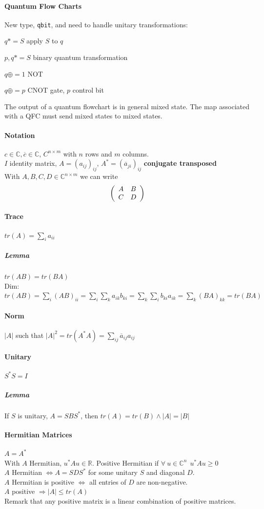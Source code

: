 \documentclass[10pt]{report}
\begin{document}
\paragraph{Quantum Flow Charts} New type, \texttt{qbit}, and need to handle unitary transformations:
\begin{list}{}{}
	\item $q*=S$ apply $S$ to $q$
	\item $p,q*=S$ binary quantum transformation
	\item $q\oplus =1$ NOT
	\item $q\oplus =p$ CNOT gate, $p$ control bit
\end{list}
The output of a quantum flowchart is in general mixed state. The map associated with a QFC must send mixed states to mixed states.
\paragraph{Notation} $c\in \mathbb{C}, \overline{c} \in \mathbb{C}$, $C^{n\times m}$ with $n$ rows and $m$ columns.\\
$I$ identity matrix, $A= (a_{ij})_{ij}$, $A^* = (\overline{a}_{ji})_{ij}$ \textbf{conjugate transposed}\\
With $A,B,C,D\in \mathbb{C}^{n\times m}$ we can write
$$\left(\begin{array}{c c}
A & B \\ C & D
\end{array}\right)$$
\paragraph{Trace} $tr(A) = \sum_i a_{ii}$
\subparagraph{Lemma} $tr(AB) = tr(BA)$\\
Dim: $tr(AB) = \sum_i (AB)_{ii} = \sum_i \sum_k a_{ik}b_{ki} = \sum_k\sum_i b_{ki}a_{ik} = \sum_k (BA)_{kk} = tr(BA)$
\paragraph{Norm} $|A|$ such that $|A|^2 = tr(A^*A) = \sum_{ij}\overline{a}_{ij}a_{ij}$
\paragraph{Unitary} $S^*S = I$
\subparagraph{Lemma} If $S$ is unitary, $A = SBS^*$, then $tr(A) = tr(B)\wedge |A| = |B|$
\paragraph{Hermitian Matrices} $A = A^*$\\
With $A$ Hermitian, $u^*Au\in \mathbb{R}$. Positive Hermitian if $\forall\:u\in \mathbb{C}^n\:\:u^*Au \geq 0$\\
$A$ Hermitian $\Leftrightarrow A = SDS^*$ for some unitary $S$ and diagonal $D$.\\
$A$ Hermitian is positive $\Leftrightarrow$ all entries of $D$ are non-negative.\\
$A$ positive $\Rightarrow |A| \leq tr(A)$\\
Remark that any positive matrix is a linear combination of positive matrices.
\end{document}
